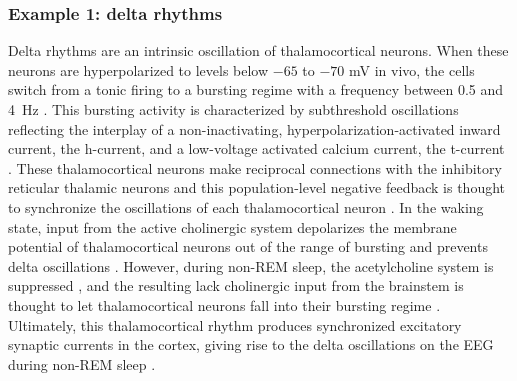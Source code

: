 \subsubsection{Example 1: delta rhythms}
Delta rhythms are an intrinsic oscillation of thalamocortical neurons. When these neurons are hyperpolarized to levels below $-65$ to $-70$ \unit{\milli\volt} in vivo, the cells switch from a tonic firing to a bursting regime with a frequency between 0.5 and \qty{4}{\hertz} \cite{Dossi1992}. This bursting activity is characterized by subthreshold oscillations reflecting the interplay of a non-inactivating, hyperpolarization-activated inward current, the h-current, and a low-voltage activated calcium current, the t-current \cite{McCormick1990,Soltesz1991}. These thalamocortical neurons make reciprocal connections with the inhibitory reticular thalamic neurons and this population-level negative feedback is thought to synchronize the oscillations of each thalamocortical neuron \cite{Steriade1991, Steriade1993}. In the waking state, input from the active cholinergic system depolarizes the membrane potential of thalamocortical neurons out of the range of bursting and prevents delta oscillations \cite{Steriade2003}. However, during non-REM sleep, the acetylcholine system is suppressed \cite{Watson2010}, and the resulting lack cholinergic input from the brainstem is thought to let thalamocortical neurons fall into their bursting regime \cite{Steriade2003}. Ultimately, this thalamocortical rhythm produces synchronized excitatory synaptic currents in the cortex, giving rise to the delta oscillations on the EEG during non-REM sleep \cite{Amzica1998}.

